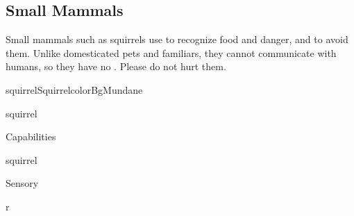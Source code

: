 \subsection{Small Mammals}


Small mammals such as squirrels use  to recognize food and danger,
and  to avoid them.
Unlike domesticated pets and familiars, they cannot communicate with
humans, so they have no .
Please do not hurt them.\\


\begin{actorCardMiniEuro}{squirrel}{Squirrel}{colorBgMundane}

	\begin{capabilitiesBox}{squirrel}
		\begin{capabilitiesTable}{Capabilities}
		\end{capabilitiesTable}
	\end{capabilitiesBox}

	\begin{speciesBonusBox}{squirrel}
		\begin{bonusTable}{Sensory}
		\end{bonusTable}
	\end{speciesBonusBox}
\end{actorCardMiniEuro}


\begin{wrapfigure}{r}{}
\end{wrapfigure}



